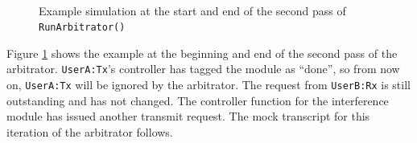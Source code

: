 \begin{figure}[!h]
\centering \mbox{
     \quad
} \caption[Arbitrator Example: Loop 2]{Example simulation at the
start and end of the second pass of \tt{RunArbitrator()}}
\label{fig:arbitEx2}
\end{figure}

Figure \ref{fig:arbitEx2} shows the example at the beginning and end
of the second pass of the arbitrator.  \verb+UserA:Tx+'s controller
has tagged the module as ``done'', so from now on, \verb+UserA:Tx+
will be ignored by the arbitrator.  The request from \verb+UserB:Rx+
is still outstanding and has not changed.  The controller function
for the interference module has issued another transmit request. The
mock transcript for this iteration of the arbitrator follows.

